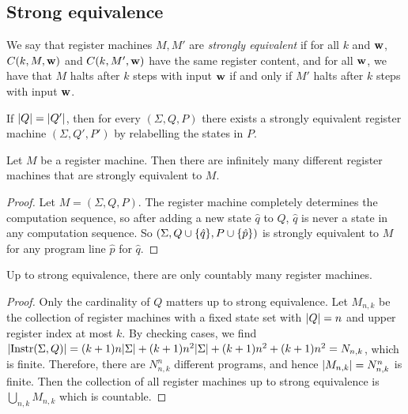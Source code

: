 \subsection{Strong equivalence}
\begin{definition}
	We say that register machines \( M, M' \) are \emph{strongly equivalent} if for all \( k \) and \( \vb w \), \( C(k,M,\vb w) \) and \( C(k,M',\vb w) \) have the same register content, and for all \( \vb w \), we have that \( M \) halts after \( k \) steps with input \( \vb w \) if and only if \( M' \) halts after \( k \) steps with input \( \vb w \).
\end{definition}
\begin{remark}
	If \( \abs{Q} = \abs{Q'} \), then for every \( (\Sigma, Q, P) \) there exists a strongly equivalent register machine \( (\Sigma, Q', P') \) by relabelling the states in \( P \).
\end{remark}
\begin{proposition}
	Let \( M \) be a register machine.
	Then there are infinitely many different register machines that are strongly equivalent to \( M \).
\end{proposition}
\begin{proof}
	Let \( M = (\Sigma, Q, P) \).
	The register machine completely determines the computation sequence, so after adding a new state \( \hat q \) to \( Q \), \( \hat q \) is never a state in any computation sequence.
	So \( (\Sigma, Q \cup \qty{\hat q}, P \cup \qty{\hat p}) \) is strongly equivalent to \( M \) for any program line \( \hat p \) for \( \hat q \).
\end{proof}
\begin{proposition}
	Up to strong equivalence, there are only countably many register machines.
\end{proposition}
\begin{proof}
	Only the cardinality of \( Q \) matters up to strong equivalence.
	Let \( M_{n,k} \) be the collection of register machines with a fixed state set with \( \abs{Q} = n \) and upper register index at most \( k \).
	By checking cases, we find \( \abs{\operatorname{Instr}(\Sigma,Q)} = (k+1)n\abs{\Sigma} + (k+1)n^2\abs{\Sigma} + (k+1)n^2 + (k+1)n^2 = N_{n,k} \), which is finite.
	Therefore, there are \( N_{n,k}^n \) different programs, and hence \( \abs{M_{n,k}} = N_{n,k}^n \) is finite.
	Then the collection of all register machines up to strong equivalence is \( \bigcup_{n,k} M_{n,k} \) which is countable.
\end{proof}

